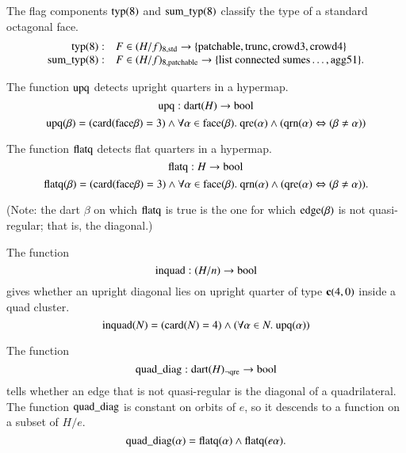 \begin{definition}
The flag components ${\operatorname{typ}}(8)$ and ${\operatorname{sum\_typ}}(8)$
classify the type of a standard octagonal face.
    $$
    \begin{array}{rll}
    {\operatorname{typ}}(8):& F\in (H/f)_{8,{\operatorname{std}}}
    \to
    \{{\operatorname{patchable}},{\operatorname{trunc}},{\operatorname{crowd3}},{\operatorname{crowd4}}\}\\
    {\operatorname{sum\_typ}}(8):& F\in (H/f)_{8,{\operatorname{patchable}}}
    \to
    \{\text{list connected sumes}\ldots,{\operatorname{agg51}}\}.
    \end{array}
    $$
\end{definition}


\begin{definition} The function ${\operatorname{upq}}$ detects upright
quarters in a hypermap.
    $${\operatorname{upq}}:{\operatorname{dart}}(H) \to \operatorname{bool}$$
    $${\operatorname{upq}}(\beta) =  ({\operatorname{card}}({\operatorname{face}}\beta)=3)\wedge
      \forall\alpha\in {\operatorname{face}}(\beta).\
         {\operatorname{qre}}(\alpha)\wedge
         ({\operatorname{qrn}}(\alpha)\Leftrightarrow
         (\beta\ne\alpha))$$
\end{definition}

\begin{definition}
The function ${\operatorname{flatq}}$ detects flat quarters in a hypermap.
     $${\operatorname{flatq}}:H \to \operatorname{bool}$$
    $${\operatorname{flatq}}(\beta) = ({\operatorname{card}}({\operatorname{face}}\beta)=3)\wedge
       \forall\alpha\in {\operatorname{face}}(\beta).\
         {\operatorname{qrn}}(\alpha)\wedge
         ({\operatorname{qre}}(\alpha) \Leftrightarrow
         (\beta\ne\alpha)).$$
\end{definition}
(Note: the dart $\beta$ on which ${\operatorname{flatq}}$ is true is the one
for which ${\operatorname{edge}}(\beta)$ is not quasi-regular; that is, the
diagonal.)


\begin{definition}[inquad]
The function
    $${\operatorname{inquad}}:(H/n)\to \operatorname{bool}$$
gives whether an upright diagonal lies on upright quarter of type
${\operatorname{\bf c}}{(4,0)}$ inside a quad cluster.
    $${\operatorname{inquad}}(N) =
    ({\operatorname{card}}(N)=4) \wedge (\forall \alpha\in N.\
        {\operatorname{upq}}(\alpha))
    $$
\end{definition}

\begin{definition}
The function
    $${\operatorname{quad\_diag}}:{\operatorname{dart}}(H)_{\neg{\operatorname{qre}}} \to \operatorname{bool}$$
tells whether an edge that is not quasi-regular is the diagonal of
a quadrilateral.  The function ${\operatorname{quad\_diag}}$ is constant on
orbits of $e$, so it descends to a function on a subset of $H/e$.
$$
    {\operatorname{quad\_diag}}(\alpha) = {\operatorname{flatq}}(\alpha)\wedge
    {\operatorname{flatq}}(e\alpha).
$$
\end{definition}

